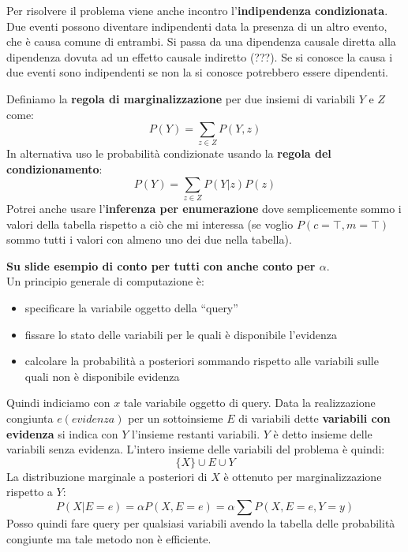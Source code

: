 \message{ !name(modprob.tex)}\documentclass[a4paper,12pt, oneside]{book}
\begin{document}
Per risolvere il problema viene anche incontro l'\textbf{indipendenza
  condizionata}.\\
Due eventi possono diventare indipendenti data la presenza di un altro evento,
che è causa comune di entrambi. Si passa da una dipendenza causale diretta alla
dipendenza dovuta ad un effetto causale indiretto (???). Se si conosce la causa
i due eventi sono indipendenti se non la si conosce potrebbero essere
dipendenti.
\begin{definizione}
  Definiamo la \textbf{regola di marginalizzazione} per due insiemi di variabili
  $Y$ e $Z$ come:
  \[P(Y)=\sum_{z\in Z}P(Y,z)\]
  In alternativa uso le probabilità condizionate usando la \textbf{regola del
    condizionamento}:
  \[P(Y)=\sum_{z\in Z}P(Y|z)P(z)\]
  Potrei anche usare l'\textbf{inferenza per enumerazione} dove semplicemente
  sommo i valori della tabella rispetto a ciò che mi interessa (se voglio
  $P(c=\top,m=\top)$ sommo tutti i valori con almeno uno dei due nella tabella).
\end{definizione}
\textbf{Su slide esempio di conto per tutti con anche conto per $\alpha$}.\\
Un principio generale di computazione è:
\begin{itemize}
  \item specificare la variabile oggetto della ``query''
  \item fissare lo stato delle variabili per le quali è disponibile l'evidenza
  \item calcolare la probabilità a posteriori sommando
  rispetto alle variabili sulle quali non è disponibile evidenza 
\end{itemize}
Quindi indiciamo con $x$ tale variabile oggetto di query. Data la realizzazione
congiunta $e(evidenza)$ per un sottoinsieme $E$ di variabili dette
\textbf{variabili con evidenza} si indica con $Y$ l'insieme restanti
variabili. $Y$ è detto insieme delle variabili senza evidenza. L'intero insieme
delle variabili del problema è quindi:
\[\{X\}\cup E \cup Y\]
La distribuzione marginale a posteriori di $X$ è ottenuto per marginalizzazione
rispetto a $Y$:
\[P(X|E=e)=\alpha P(X,E=e)=\alpha\sum P(X,E=e,Y=y)\]
Posso quindi fare query per qualsiasi variabili avendo la tabella delle
probabilità congiunte ma tale metodo non è efficiente.
\end{document}
